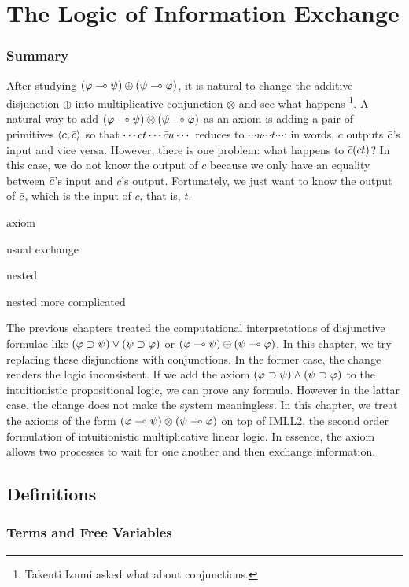 \chapter{The Logic of Information Exchange}
\label{ch:exchange}

\subsection{Summary}

After studying $(\varphi\multimap\psi)\oplus (\psi\multimap\varphi)$,
it is natural to change the additive disjunction $\oplus$ into
multiplicative conjunction $\otimes$ and see what happens%
\footnote{Takeuti Izumi asked what about conjunctions.}.
A natural way to add $(\varphi\multimap\psi)\otimes(\psi\multimap\varphi)$ as an axiom
is adding a pair of primitives $\langle{c,\bar{c}}\rangle$ so that
$\cdots ct \cdots \bar{c} u \cdots$ reduces to
$\cdots u  \cdots t \cdots$: in words,
$c$ outputs $\bar{c}$'s input and vice versa.
However, there is one problem: what happens to $\bar{c}(c t)$?
In this case, we do not know the output of $c$ because we only have an
equality between $\bar{c}$'s input and $c$'s output.
Fortunately, we just want to know the output of $\bar{c}$, which is the
input of $c$, that is, $t$.

axiom

usual exchange

nested

nested more complicated

The previous chapters treated the computational interpretations of
disjunctive formulae like $(\varphi\supset\psi)\lor(\psi\supset\varphi)$ or
$(\varphi\multimap\psi)\oplus(\psi\multimap\varphi)$.  In this chapter, we try
replacing these disjunctions with conjunctions.
In the former case, the change renders the logic inconsistent.
If we add the axiom $(\varphi\supset\psi)\land(\psi\supset\varphi)$ to the
intuitionistic propositional logic,
we can prove any formula.  However in the lattar case, the change does
not make the system meaningless.
In this chapter, we treat
the axioms of the form $(\varphi\multimap\psi)\otimes(\psi\multimap\varphi)$
on top of IMLL2, the second order formulation of intuitionistic
multiplicative linear
logic.  In essence, the axiom allows two processes to wait for one
another and then exchange information.

\section{Definitions}

\subsection{Terms and Free Variables}

